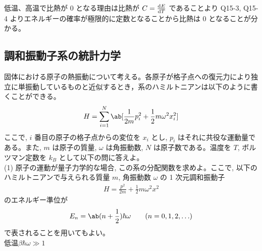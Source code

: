 \documentclass[a4paper,11pt]{jlreq}
\begin{document}
低温、高温で比熱が 0 となる理由は比熱が $C = \diff{E}{T}$ であることより Q15-3, Q15-4 よりエネルギーの確率が極限的に定数となることから比熱は 0 となることが分かる。



\subsection{調和振動子系の統計力学}
固体における原子の熱振動について考える。各原子が格子点への復元力により独立に単振動しているものと近似するとき，系のハミルトニアンは以下のように書くことができる。
\begin{align}
  H = \sum_{i=1}^{N}\ab[\frac{1}{2m}p_i^2 + \frac{1}{2}m\omega^2x_i^2]
\end{align}
ここで, $i$ 番目の原子の格子点からの変位を $x_i$ とし, $p_i$ はそれに共役な運動量である。また, $m$ は原子の質量, $\omega$ は角振動数, $N$ は原子数である。温度を $T$, ボルツマン定数を $k_B$ として以下の問に答えよ。 \\

(1) 原子の運動が量子力学的な場合, この系の分配関数を求めよ。ここで, 以下のハミルトニアンで与えられる質量 $m$, 角振動数 $\omega$ の 1 次元調和振動子
\begin{align}
  H = \frac{p^2}{2m} + \frac{1}{2}m\omega^2x^2
\end{align}
のエネルギー準位が
\begin{align}
  E_n = \ab(n + \frac{1}{2})\hbar\omega \qquad (n = 0, 1, 2, \ldots)
\end{align}
で表されることを用いてもよい。 \\
低温$\beta\hbar\omega \gg 1$
\end{document}

